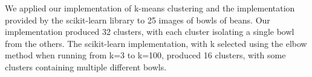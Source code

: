 \documentclass[12pt]{article}
\begin{document}
\begin{figure}[ht]
    \centering
        \xspace
        \xspace
        \xspace
\end{figure}
\newpage

We applied our implementation of k-means clustering and the implementation provided by the scikit-learn library to 25 images of bowls of beans. Our implementation produced 32 clusters, with each cluster isolating a single bowl from the others. The scikit-learn implementation, with k selected using the elbow method when running from k=3 to k=100, produced 16 clusters, with some clusters containing multiple different bowls. 
\newline
\end{document}
